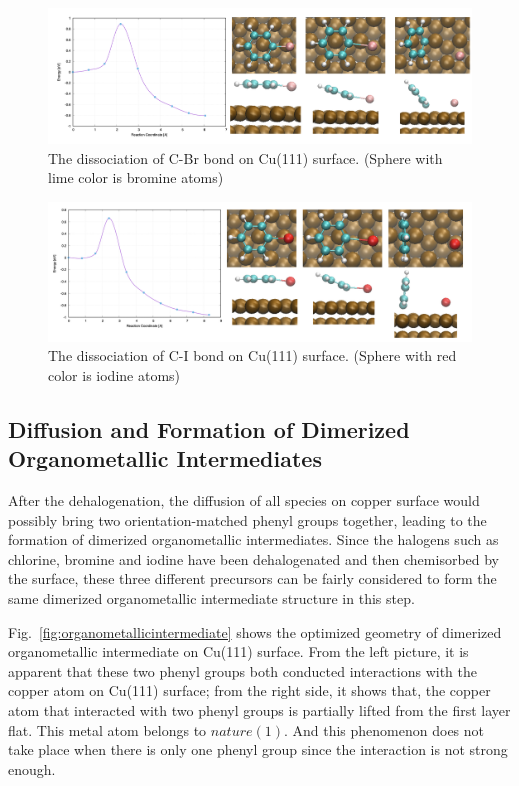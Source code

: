 \documentclass[%
 reprint,
 amsmath,amssymb,
 aps,
prb,
]{revtex4-2}
\begin{document}
\begin{figure}[hbt]
\centering
\includegraphics[width=1.0\textwidth]{Fig/dissociation_Br.png}
\caption{The dissociation of C-Br bond on Cu(111) surface. (Sphere with lime color is bromine atoms)}
\label{fig:dissociation_Br}
\end{figure}

\begin{figure}[hbt]
\centering
\includegraphics[width=1.0\textwidth]{Fig/dissociation_I.png}
\caption{The dissociation of C-I bond on Cu(111) surface. (Sphere with red color is iodine atoms)}
\label{fig:dissociation_I}
\end{figure}

\subsection{Diffusion and Formation of Dimerized Organometallic Intermediates}

After the dehalogenation, the diffusion of all species on copper surface would possibly bring two orientation-matched phenyl groups together, leading to the formation of dimerized organometallic intermediates. Since the halogens such as chlorine, bromine and iodine have been dehalogenated and then chemisorbed by the surface, these three different precursors can be fairly considered to form the same dimerized organometallic intermediate structure in this step.

Fig.~\ref{fig:organometallicintermediate} shows the optimized geometry of dimerized organometallic intermediate on Cu(111) surface. From the left picture, it is apparent that these two phenyl groups both conducted interactions with the copper atom on Cu(111) surface; from the right side, it shows that, the copper atom that interacted with two phenyl groups is partially lifted from the first layer flat. This metal atom belongs to $nature(1)$. And this phenomenon does not take place when there is only one phenyl group since the interaction is not strong enough. 
\end{document}
